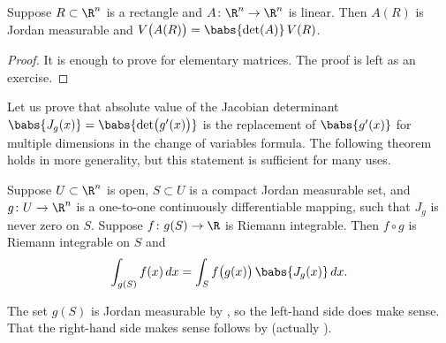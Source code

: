 \begin{prop} \label{prop:volrectdet}
Suppose $R \subset \R^n$ is a rectangle
and $A \colon \R^n \to \R^n$ is linear.  Then
$A(R)$ is Jordan measurable and $V\bigl(A(R)\bigr) = \babs{\det (A)} \, V(R)$.
\end{prop}

\begin{proof}
It is enough to prove for elementary matrices.  The proof is left as an
exercise.
\end{proof}

Let us prove that
absolute value of the Jacobian determinant
$\babs{J_g(x)} = \babs{\det \bigl(g'(x)\bigr)}$
is the replacement of $\babs{g'(x)}$ for multiple
dimensions in the change of variables formula.
The following theorem holds in more generality,
but this statement is sufficient for many uses.

\begin{thm}
Suppose $U \subset \R^n$ is open,
$S \subset U$ is a compact Jordan measurable set, and
$g \colon U \to \R^n$ is a one-to-one
continuously differentiable mapping, such that
$J_g$ is never zero on $S$.
Suppose $f \colon g(S) \to \R$ is Riemann integrable.
Then $f \circ g$ is Riemann integrable on $S$ and
\begin{equation*}
\int_{g(S)} f(x) \, dx = 
\int_S f\bigl(g(x)\bigr) \, \babs{J_g(x)} \, dx .
\end{equation*}
\end{thm}

The set $g(S)$ is Jordan measurable by ,
so the left-hand side does make sense.
That the right-hand side makes sense follows by
 (actually
).

